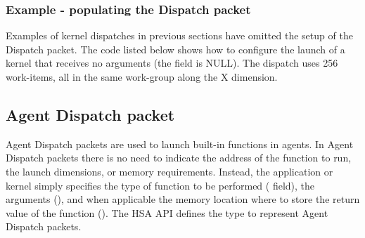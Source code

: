 \documentclass[final,oneside]{book}
\begin{document}
\subsubsection{Example - populating the Dispatch packet}
Examples of kernel dispatches in previous sections have omitted the setup of the
Dispatch packet. The code listed below shows how to configure the launch of a
kernel that receives no arguments (the
 field is NULL). The
dispatch uses 256 work-items, all in the same work-group along the X dimension.



\subsection{Agent Dispatch packet}\label{agent-packet}

Agent Dispatch packets are used to launch built-in functions in agents. In Agent
Dispatch packets there is no need to indicate the address of the function to
run, the launch dimensions, or memory requirements. Instead, the application or
kernel simply specifies the type of function to be performed
( field), the arguments
(), and when applicable the memory
location where to store the return value of the function
(). The HSA API defines the
type  to represent Agent Dispatch packets.
\end{document}
